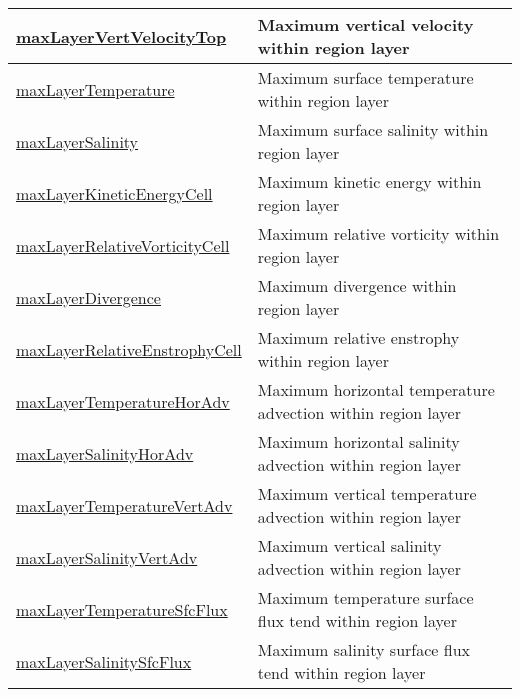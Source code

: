 {\begin{center}
\begin{longtable}{| p{2.0in} | p{4.0in} |}
    \hline
    \hyperref[subsec:var_sec_layerVolumeWeightedAverageAM_maxLayerVertVelocityTop]{maxLayerVertVelocityTop} & Maximum vertical velocity within region layer \\
    \hline
    \hyperref[subsec:var_sec_layerVolumeWeightedAverageAM_maxLayerTemperature]{maxLayerTemperature} & Maximum surface temperature within region layer \\
    \hline
    \hyperref[subsec:var_sec_layerVolumeWeightedAverageAM_maxLayerSalinity]{maxLayerSalinity} & Maximum surface salinity within region layer \\
    \hline
    \hyperref[subsec:var_sec_layerVolumeWeightedAverageAM_maxLayerKineticEnergyCell]{maxLayerKineticEnergyCell} & Maximum kinetic energy within region layer \\
    \hline
    \hyperref[subsec:var_sec_layerVolumeWeightedAverageAM_maxLayerRelativeVorticityCell]{maxLayerRelativeVorticityCell} & Maximum relative vorticity within region layer \\
    \hline
    \hyperref[subsec:var_sec_layerVolumeWeightedAverageAM_maxLayerDivergence]{maxLayerDivergence} & Maximum divergence within region layer \\
    \hline
    \hyperref[subsec:var_sec_layerVolumeWeightedAverageAM_maxLayerRelativeEnstrophyCell]{maxLayerRelativeEnstrophyCell} & Maximum relative enstrophy within region layer \\
    \hline
    \hyperref[subsec:var_sec_layerVolumeWeightedAverageAM_maxLayerTemperatureHorAdv]{maxLayerTemperatureHorAdv} & Maximum horizontal temperature advection within region layer \\
    \hline
    \hyperref[subsec:var_sec_layerVolumeWeightedAverageAM_maxLayerSalinityHorAdv]{maxLayerSalinityHorAdv} & Maximum horizontal salinity advection within region layer \\
    \hline
    \hyperref[subsec:var_sec_layerVolumeWeightedAverageAM_maxLayerTemperatureVertAdv]{maxLayerTemperatureVertAdv} & Maximum vertical temperature advection within region layer \\
    \hline
    \hyperref[subsec:var_sec_layerVolumeWeightedAverageAM_maxLayerSalinityVertAdv]{maxLayerSalinityVertAdv} & Maximum vertical salinity advection within region layer \\
    \hline
    \hyperref[subsec:var_sec_layerVolumeWeightedAverageAM_maxLayerTemperatureSfcFlux]{maxLayerTemperatureSfcFlux} & Maximum temperature surface flux tend within region layer \\
    \hline
    \hyperref[subsec:var_sec_layerVolumeWeightedAverageAM_maxLayerSalinitySfcFlux]{maxLayerSalinitySfcFlux} & Maximum salinity surface flux tend within region layer \\

\end{longtable}
\end{center}}
